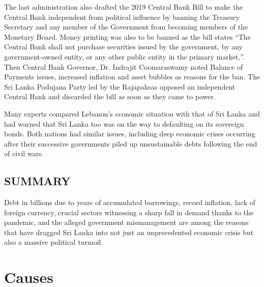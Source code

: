 \documentclass[a4paper,12pt]{article}
\begin{document}
\justifying
The last administration also drafted the 2019 Central Bank Bill to make the Central Bank independent from political influence by banning the Treasury Secretary and any member of the Government from becoming members of the Monetary Board. Money printing was also to be banned as the bill states “The Central Bank shall not purchase securities issued by the government, by any government-owned entity, or any other public entity in the primary market,”. Then Central Bank Governor, Dr. Indrajit Coomaraswamy noted Balance of Payments issues, increased inflation and asset bubbles as reasons for the ban. The Sri Lanka Podujana Party led by the Rajapaksas opposed an independent Central Bank and discarded the bill as soon as they came to power.

Many experts compared Lebanon's economic situation with that of Sri Lanka and had warned that Sri Lanka too was on the way to defaulting on its sovereign bonds. Both nations had similar issues, including deep economic crises occurring after their successive governments piled up unsustainable debts following the end of civil wars.
\subsection{SUMMARY}
Debt in billions due to years of accumulated borrowings, record inflation, lack of foreign currency, crucial sectors witnessing a sharp fall in demand thanks to the pandemic, and the alleged government mismanagement are among the reasons that have dragged Sri Lanka into not just an unprecedented economic crisis but also a massive political turmoil.

\section{Causes}
\end{document}
